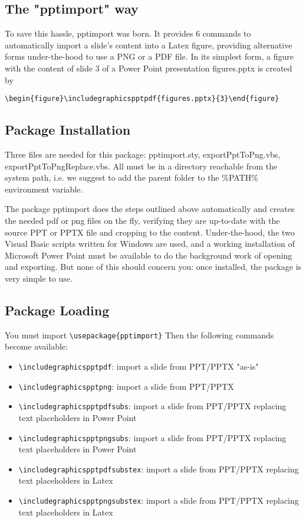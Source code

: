\documentclass[10pt,,a4paper]{article}
\begin{document}
\subsection{The "pptimport" way}
To save this hassle, pptimport was born.
It provides 6 commands to automatically import a slide's content into a Latex figure, providing alternative forms under-the-hood to use a PNG or a PDF file.
In its simplest form, a figure with the content of slide 3 of a Power Point presentation figures.pptx is created by 
\begin{verbatim}
\begin{figure}\includegraphicspptpdf{figures.pptx}{3}\end{figure}
\end{verbatim}


\subsection{Package Installation}
Three files are needed for this package: pptimport.sty, exportPptToPng.vbs, exportPptToPngReplace.vbs.
All must be in a directory reachable from the system path, i.e. we suggest to add the parent folder to the \%PATH\% environment variable.

The package pptimport does the steps outlined above automatically and creates the needed pdf or png files on the fly, verifying they are up-to-date with the source PPT or PPTX file and cropping to the content.
Under-the-hood, the two Visual Basic scripts written for Windows are used, and a working installation of Microsoft Power Point must be available to do the background work of opening and exporting.
But none of this should concern you: once installed, the package is very simple to use.


\subsection{Package Loading}
You must import \verb=\usepackage{pptimport}=
Then the following commands become available:
\begin{itemize}
	\item \verb=\includegraphicspptpdf=: import a slide from PPT/PPTX "as-is" 
\item \verb=\includegraphicspptpng=: import a slide from PPT/PPTX
\item \verb=\includegraphicspptpdfsubs=: import a slide from PPT/PPTX replacing text placeholders in Power Point
\item \verb=\includegraphicspptpngsubs=: import a slide from PPT/PPTX replacing text placeholders in Power Point
\item \verb=\includegraphicspptpdfsubstex=: import a slide from PPT/PPTX replacing text placeholders in Latex
\item \verb=\includegraphicspptpngsubstex=: import a slide from PPT/PPTX replacing text placeholders in Latex
\end{itemize}
\end{document}
